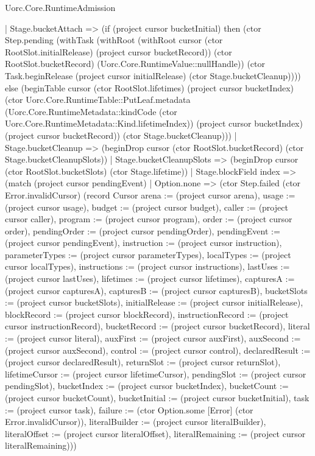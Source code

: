\begin{lexlean}{Uorc.Core.RuntimeAdmission}
\begin{semanticmodule}
{      | Stage.bucketAttach => (if (project cursor bucketInitial) then (ctor Step.pending (withTask (withRoot (withRoot cursor (ctor RootSlot.initialRelease) (project cursor bucketRecord)) (ctor RootSlot.bucketRecord) (Uorc.Core.RuntimeValue::nullHandle)) (ctor Task.beginRelease (project cursor initialRelease) (ctor Stage.bucketCleanup)))) else (beginTable cursor (ctor RootSlot.lifetimes) (project cursor bucketIndex) (ctor Uorc.Core.RuntimeTable::PutLeaf.metadata (Uorc.Core.RuntimeMetadata::kindCode (ctor Uorc.Core.RuntimeMetadata::Kind.lifetimeIndex)) (project cursor bucketIndex) (project cursor bucketRecord)) (ctor Stage.bucketCleanup)))
      | Stage.bucketCleanup => (beginDrop cursor (ctor RootSlot.bucketRecord) (ctor Stage.bucketCleanupSlots))
      | Stage.bucketCleanupSlots => (beginDrop cursor (ctor RootSlot.bucketSlots) (ctor Stage.lifetime))
      | Stage.blockField index => (match (project cursor pendingEvent)
        | Option.none => (ctor Step.failed (ctor Error.invalidCursor) (record Cursor {arena := (project cursor arena), usage := (project cursor usage), budget := (project cursor budget), caller := (project cursor caller), program := (project cursor program), order := (project cursor order), pendingOrder := (project cursor pendingOrder), pendingEvent := (project cursor pendingEvent), instruction := (project cursor instruction), parameterTypes := (project cursor parameterTypes), localTypes := (project cursor localTypes), instructions := (project cursor instructions), lastUses := (project cursor lastUses), lifetimes := (project cursor lifetimes), capturesA := (project cursor capturesA), capturesB := (project cursor capturesB), bucketSlots := (project cursor bucketSlots), initialRelease := (project cursor initialRelease), blockRecord := (project cursor blockRecord), instructionRecord := (project cursor instructionRecord), bucketRecord := (project cursor bucketRecord), literal := (project cursor literal), auxFirst := (project cursor auxFirst), auxSecond := (project cursor auxSecond), control := (project cursor control), declaredResult := (project cursor declaredResult), returnSlot := (project cursor returnSlot), lifetimeCursor := (project cursor lifetimeCursor), pendingSlot := (project cursor pendingSlot), bucketIndex := (project cursor bucketIndex), bucketCount := (project cursor bucketCount), bucketInitial := (project cursor bucketInitial), task := (project cursor task), failure := (ctor Option.some [Error] (ctor Error.invalidCursor)), literalBuilder := (project cursor literalBuilder), literalOffset := (project cursor literalOffset), literalRemaining := (project cursor literalRemaining)}))
}
\end{semanticmodule}
\end{lexlean}
